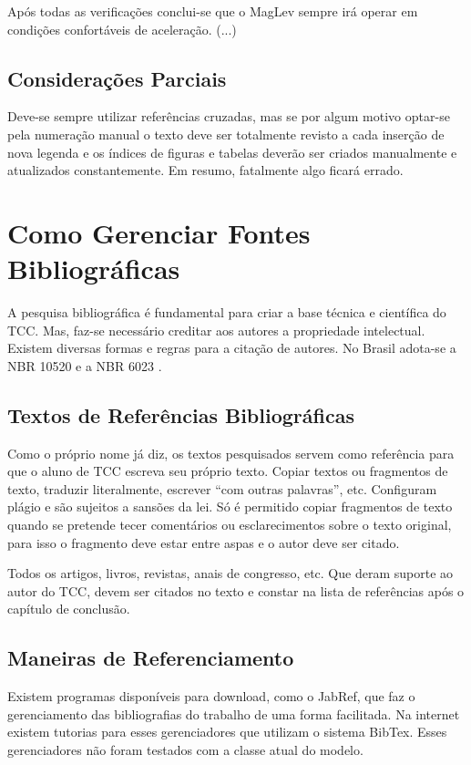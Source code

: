 \documentclass[
        oneside,      %
        english,			
        brazil			 
        ]{configcefetmglpd}
\begin{document}
Após todas as verificações conclui-se que o MagLev sempre irá operar em condições confortáveis de aceleração. (...)

\section{Considerações Parciais}
Deve-se sempre utilizar referências cruzadas, mas se por algum motivo optar-se pela numeração manual o texto deve ser totalmente revisto a cada inserção de nova legenda e os índices de figuras e tabelas deverão ser criados manualmente e atualizados constantemente. Em resumo, fatalmente algo ficará errado.

\chapter{Como Gerenciar Fontes Bibliográficas}
A pesquisa bibliográfica é fundamental para criar a base técnica e científica do TCC. Mas, faz-se necessário creditar aos autores a propriedade intelectual. Existem diversas formas e regras para a citação de autores. No Brasil adota-se a NBR 10520 \cite{bib:abnt10520} e a NBR 6023 \cite{bib:abnt6023}.

\section{Textos de Referências Bibliográficas}
Como o próprio nome já diz, os textos pesquisados servem como referência para que o aluno de TCC escreva seu próprio texto. Copiar textos ou fragmentos de texto, traduzir literalmente, escrever “com outras palavras”, etc. Configuram plágio e são sujeitos a sansões da lei. Só é permitido copiar fragmentos de texto quando se pretende tecer comentários ou esclarecimentos sobre o texto original, para isso o fragmento deve estar entre aspas e o autor deve ser citado.

Todos os artigos, livros, revistas, anais de congresso, etc. Que deram suporte ao autor do TCC, devem ser citados no texto e constar na lista de referências após o capítulo de conclusão.

\section{Maneiras de Referenciamento}
Existem programas disponíveis para download, como o JabRef, que faz o gerenciamento das bibliografias do trabalho de uma forma facilitada. Na internet existem tutorias para esses gerenciadores que utilizam o sistema BibTex. Esses gerenciadores não foram testados com a classe atual do modelo.
\end{document}
